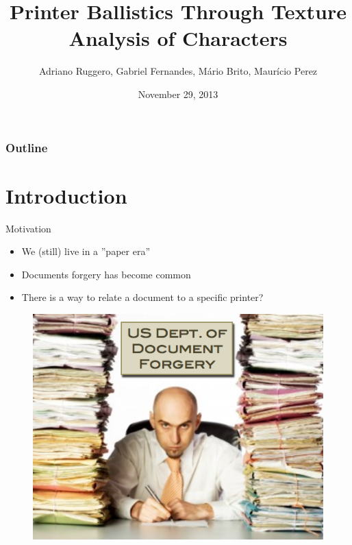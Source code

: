 \documentclass[notes]{beamer}
\title{Printer Ballistics Through Texture Analysis of Characters}
\subtitle{}
\institute{Institute of Computing - Unicamp}
\date{November 29, 2013}
\author{Adriano Ruggero, Gabriel Fernandes, Mário Brito, Maurício Perez}
\begin{document}
\begin{frame}
  \titlepage
\end{frame}

\begin{frame}
  \frametitle{Outline}
  \tableofcontents
\end{frame}

\section{Introduction}
\begin{frame}

\begin{block}{Motivation}

\begin{itemize}

\item We (still) live in a ''paper era''

\item Documents forgery has become common

\item There is a way to relate a document to a specific printer?

\end{itemize}

\end{block}


\begin{figure}[!htb]
\centering
\includegraphics[scale=0.35]{forgery}
\label{fig:forgery}
\end{figure}

\end{frame}
\end{document}

